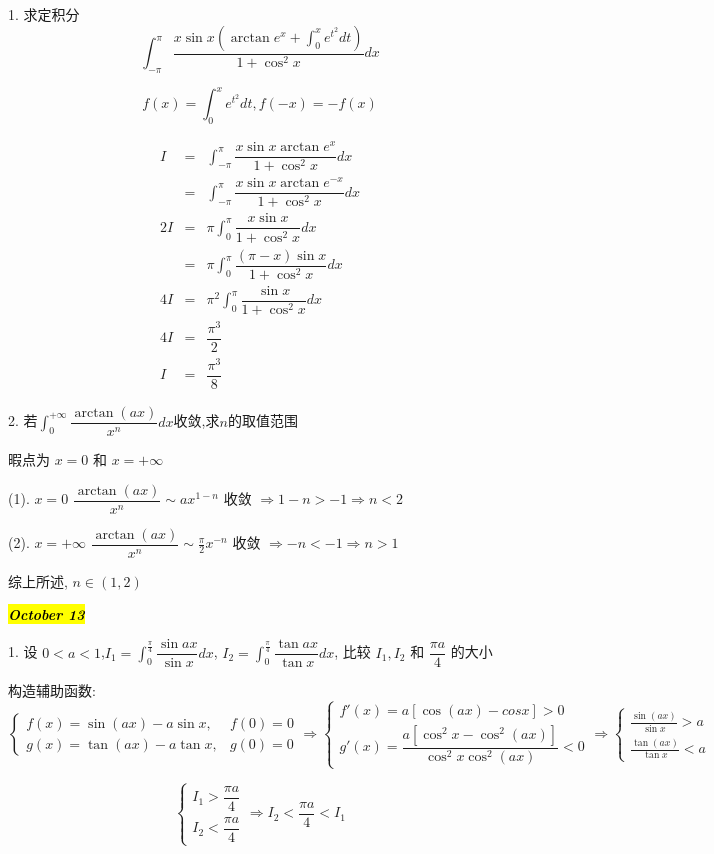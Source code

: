1. 求定积分 
$$\displaystyle{\int_{-\pi}^{\pi}\dfrac{x\sin x\left( \arctan e^x+\int_{0}^{x}e^{t^2}dt\right) }{1+\cos^2 x}dx}$$
\begin{solution}

	$$f(x) = \int_{0}^{x}e^{t^{2}}dt, f(-x) = -f(x)$$
	
	\begin{eqnarray*}
		I & = & \int_{-\pi}^{\pi}\dfrac{x\sin x\arctan e^x}{1+\cos^2 x}dx\\
		  & = & \int_{-\pi}^{\pi}\dfrac{x\sin x\arctan e^{-x}}{1+\cos^2 x}dx\\
	   2I & = & \pi\int_{0}^{\pi}\dfrac{x\sin x}{1+\cos^2 x}dx\\
		  & = & \pi\int_{0}^{\pi}\dfrac{(\pi-x)\sin x}{1+\cos^2 x}dx\\
	   4I & = & \pi^2\int_{0}^{\pi}\dfrac{\sin x}{1+\cos^2 x}dx\\
	   4I & = & \dfrac{\pi^3}{2}\\
		I & = & \dfrac{\pi^3}{8}
	\end{eqnarray*}
\end{solution}

2. 若$\int_{0}^{+\infty}\dfrac{\arctan(ax)}{x^n}dx$收敛,求$n$的取值范围
\begin{solution}

	暇点为 $x = 0$ 和 $x = +\infty$
	
	(1). $x=0$ $\dfrac{\arctan (ax)}{x^n}\sim ax^{1-n}$ 收敛 $\Rightarrow 1-n>-1\Rightarrow n<2$
	
	(2). $x=+\infty$ $\dfrac{\arctan (ax)}{x^n}\sim \frac{\pi}{2}x^{-n}$ 收敛 $\Rightarrow -n<-1\Rightarrow n>1$
	
	综上所述, $n\in(1,2)$
\end{solution}

\hl{\textbf{\textit{October 13}}}

1. 设 $0<a<1$,$\displaystyle{I_{1}=\int_{0}^{\frac{\pi}{4}}\dfrac{\sin ax}{\sin x}dx}$,
$\displaystyle{I_{2}=\int_{0}^{\frac{\pi}{4}}\dfrac{\tan ax}{\tan x}dx}$,
比较 $I_{1},I_{2}$ 和 $\dfrac{\pi a}{4}$ 的大小
\begin{solution}

	构造辅助函数: 
	$$\begin{cases}
		f(x) = \sin(ax) - a\sin x, & f(0) = 0 \\
		g(x) = \tan(ax) - a\tan x, & g(0) = 0
	\end{cases}\Rightarrow 
	\begin{cases} 
		f'(x) = a[\cos(ax) - cos x] > 0\\
		g'(x) = \dfrac{a[\cos^{2}x-\cos^{2}(ax)]}{\cos^{2}x\cos^{2}(ax)} < 0
	\end{cases}\Rightarrow 
	\begin{cases}
		\frac{\sin(ax)}{\sin x} > a\\
		\frac{\tan(ax)}{\tan x} < a
	\end{cases}$$
	
	$$\begin{cases}
		I_{1} > \dfrac{\pi a}{4}\\
		I_{2} < \dfrac{\pi a}{4}
	\end{cases}\Rightarrow I_{2} < \dfrac{\pi a}{4} < I_{1}$$
\end{solution}

